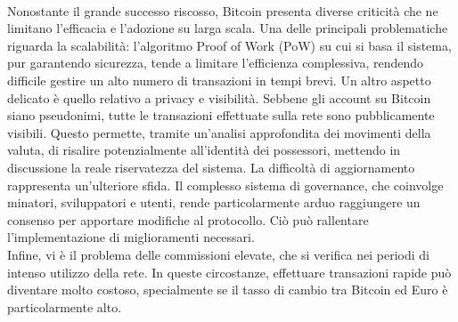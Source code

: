 \\Nonostante il grande successo riscosso, Bitcoin presenta diverse criticità che ne limitano l'efficacia e l'adozione su larga scala. Una delle principali problematiche riguarda la scalabilità: l'algoritmo Proof of Work (PoW) su cui si basa il sistema, pur garantendo sicurezza, tende a limitare l'efficienza complessiva, rendendo difficile gestire un alto numero di transazioni in tempi brevi.
Un altro aspetto delicato è quello relativo a privacy e visibilità. Sebbene gli account su Bitcoin siano pseudonimi, tutte le transazioni effettuate sulla rete sono pubblicamente visibili. Questo permette, tramite un'analisi approfondita dei movimenti della valuta, di risalire potenzialmente all'identità dei possessori, mettendo in discussione la reale riservatezza del sistema.
La difficoltà di aggiornamento rappresenta un'ulteriore sfida. Il complesso sistema di governance, che coinvolge minatori, sviluppatori e utenti, rende particolarmente arduo raggiungere un consenso per apportare modifiche al protocollo. Ciò può rallentare l'implementazione di miglioramenti necessari.
\\Infine, vi è il problema delle commissioni elevate, che si verifica nei periodi di intenso utilizzo della rete. In queste circostanze, effettuare transazioni rapide può diventare molto costoso, specialmente se il tasso di cambio tra Bitcoin ed Euro è particolarmente alto.

\newpage
